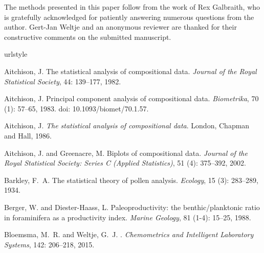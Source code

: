 \documentclass{article}
\begin{document}
The methods presented in this paper follow from the work of Rex
Galbraith, who is gratefully acknowledged for patiently answering
numerous questions from the author.  Gert-Jan Weltje and an anonymous
reviewer are thanked for their constructive comments on the submitted
manuscript.

%
%
%

\begin{thebibliography}{32}
\providecommand{\natexlab}[1]{#1}
\providecommand{\url}[1]{\texttt{#1}}
\expandafter\ifx\csname urlstyle\endcsname\relax
  \providecommand{\doi}[1]{doi: #1}\else
  \providecommand{\doi}{doi: \begingroup \urlstyle{rm}\Url}\fi

Aitchison, J.
\newblock The statistical analysis of compositional data.
\newblock \emph{Journal of the Royal Statistical Society}, 44:
  139--177, 1982.

Aitchison, J.
\newblock Principal component analysis of compositional data.
\newblock \emph{Biometrika}, 70 (1): 57--65, 1983.
\newblock \doi{10.1093/biomet/70.1.57}.

Aitchison, J.
\newblock \emph{The statistical analysis of compositional data}.
\newblock London, Chapman and Hall, 1986.

Aitchison, J. and Greenacre, M.
\newblock Biplots of compositional data.
\newblock \emph{Journal of the Royal Statistical Society: Series C (Applied
  Statistics)}, 51 (4): 375--392, 2002.

Barkley, F.~A.
\newblock The statistical theory of pollen analysis.
\newblock \emph{Ecology}, 15 (3): 283--289, 1934.

Berger, W. and Diester-Haass, L.
\newblock Paleoproductivity: the benthic/planktonic ratio in foraminifera as a
  productivity index.
\newblock \emph{Marine Geology}, 81 (1-4): 15--25, 1988.

Bloemsma, M.~R. and Weltje, G.~J.
.
\newblock \emph{Chemometrics and Intelligent Laboratory Systems}, 142:
  206--218, 2015.


\end{thebibliography}
\end{document}
